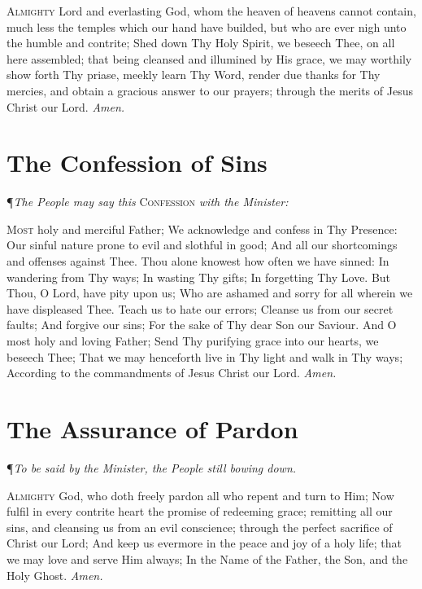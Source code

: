 \noindent\lettrine{A}{lmighty} Lord and everlasting God, whom the heaven of heavens cannot contain, much less the temples which our hand have builded, but who are ever nigh unto the humble and contrite; Shed down Thy Holy Spirit, we beseech Thee, on all here assembled; that being cleansed and illumined by His grace, we may worthily show forth Thy priase, meekly learn Thy Word, render due thanks for Thy mercies, and obtain a gracious answer to our prayers; through the merits of Jesus Christ our Lord. \textit{Amen.} \\

\section*{The Confession of Sins}

{\centering \P \textit{The People may say this} \textsc{Confession} \textit{with the Minister:}\par}
\vspace{1ex}
\lettrine{M}{ost} holy and merciful Father; We acknowledge and confess in Thy Presence: Our sinful nature prone to evil and slothful in good; And all our shortcomings and offenses against Thee.
Thou alone knowest how often we have sinned: In wandering from Thy ways; In wasting Thy gifts; In forgetting Thy Love.
But Thou, O Lord, have pity upon us; Who are ashamed and sorry for all wherein we have displeased Thee.
Teach us to hate our errors; Cleanse us from our secret faults; And forgive our sins; For the sake of Thy dear Son our Saviour.
And O most holy and loving Father; Send Thy purifying grace into our hearts, we beseech Thee; That we may henceforth live in Thy light and walk in Thy ways; According to the commandments of Jesus Christ our Lord. \textit{Amen.}

\section*{The Assurance of Pardon}
{\centering\P\textit{To be said by the Minister, the People still bowing down.} \par}
\vspace{1ex}

\lettrine{A}{lmighty} God, who doth freely pardon all who repent and turn to Him; Now fulfil in every contrite heart the promise of redeeming grace; remitting all our sins, and cleansing us from an evil conscience; through the perfect sacrifice of Christ our Lord; And keep us evermore in the peace and joy of a holy life; that we may love and serve Him always; In the Name of the Father, the Son, and the Holy Ghost. \textit{Amen.} \\

